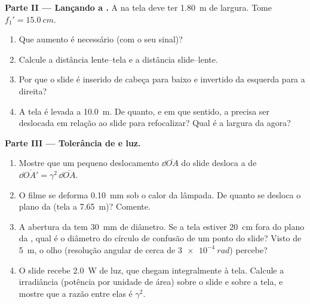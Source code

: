 \begin{problem}
\medskip
\noindent\textbf{Parte II --- Lançando a .}
A  na tela deve ter \qty{1.80}{m} de largura. Tome
$f_1' = \qty{15.0}{cm}$.
\begin{enumerate}[resume]
  \item Que aumento é necessário (com o seu sinal)?
  \item Calcule a distância lente--tela e a distância slide--lente.
  \item Por que o slide é inserido de cabeça para baixo e invertido da esquerda para a direita?
  \item A tela é levada a \qty{10.0}{m}. De quanto, e em que
        sentido, a  precisa ser deslocada em relação ao slide para
        refocalizar? Qual é a largura da  agora?
\end{enumerate}

\medskip
\noindent\textbf{Parte III --- Tolerância de  e luz.}
\begin{enumerate}[resume]
  \item Mostre que um pequeno deslocamento $\dd\overline{OA}$ do slide
        desloca a  de $\dd\overline{OA'} = \gamma^2\,\dd\overline{OA}$.
  \item O filme se deforma \qty{0.10}{mm} sob o calor da lâmpada. De quanto
        se desloca o plano da  (tela a \qty{7.65}{m})?
        Comente.
  \item A abertura da  tem \qty{30}{mm} de diâmetro. Se a tela
        estiver \qty{20}{cm} fora do plano da , qual é o diâmetro do
        círculo de confusão de um ponto do slide? Visto de \qty{5}{m},
        o olho (resolução angular de cerca de $\qty{3e-4}{rad}$) percebe?
  \item O slide recebe \qty{2.0}{W} de luz, que chegam integralmente à
        tela. Calcule a irradiância (potência por unidade de área) sobre o
        slide e sobre a tela, e mostre que a razão entre elas é $\gamma^2$.
\end{enumerate}


\end{problem}
